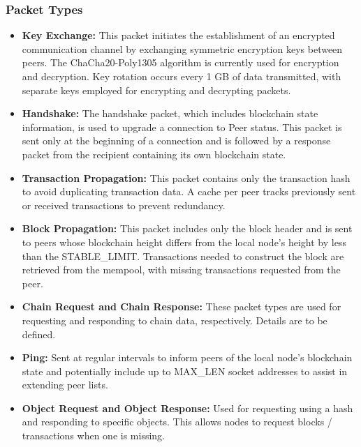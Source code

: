 \documentclass[10pt,a4paper,twocolumn]{article}
\begin{document}
\subsubsection{Packet Types}
\begin{itemize}
\item \textbf{Key Exchange:} This packet initiates the establishment of an encrypted communication channel by exchanging symmetric encryption keys between peers. The ChaCha20-Poly1305 algorithm is currently used for encryption and decryption. Key rotation occurs every 1 GB of data transmitted, with separate keys employed for encrypting and decrypting packets.

\item \textbf{Handshake:} The handshake packet, which includes blockchain state information, is used to upgrade a connection to Peer status. This packet is sent only at the beginning of a connection and is followed by a response packet from the recipient containing its own blockchain state.\\

\item \textbf{Transaction Propagation:} This packet contains only the transaction hash to avoid duplicating transaction data. A cache per peer tracks previously sent or received transactions to prevent redundancy.\\

\item \textbf{Block Propagation:} This packet includes only the block header and is sent to peers whose blockchain height differs from the local node’s height by less than the STABLE\_LIMIT. Transactions needed to construct the block are retrieved from the mempool, with missing transactions requested from the peer.\\

\item \textbf{Chain Request and Chain Response:} These packet types are used for requesting and responding to chain data, respectively. Details are to be defined.\\

\item \textbf{Ping:} Sent at regular intervals to inform peers of the local node’s blockchain state and potentially include up to MAX\_LEN socket addresses to assist in extending peer lists.\\

\item \textbf{Object Request and Object Response:} Used for requesting using a hash and responding to specific objects. This allows nodes to request blocks / transactions when one is missing.\\


\end{itemize}
\end{document}
